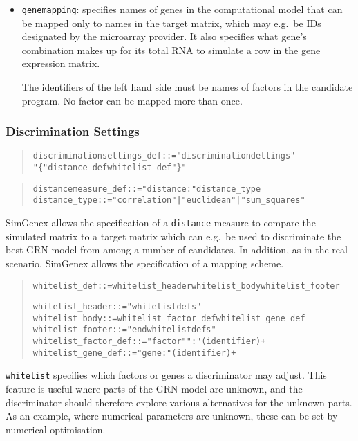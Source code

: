 \documentclass[a4paper,fleqn]{article}
\newcommand{\computercode}[1]{\texttt{#1}}
\newenvironment{ebnfrule}{\begin{footnotesize}\begin{quote}\begin{alltt}}{\end{alltt}\end{quote}\end{footnotesize}}
\begin{document}
\begin{itemize}
\begin{ebnfrule}
\end{ebnfrule}

\item \computercode{genemapping}: specifies names of genes in the computational 
model that can be mapped only to names in the target matrix, which may e.g.\ be IDs 
designated by the microarray provider. It also specifies what gene's
combination makes up for its total RNA to simulate a row in the gene expression matrix. 

The identifiers of the left hand side must be names of factors in the
candidate program. No factor can be mapped more than once.
\end{itemize}



\subsubsection{Discrimination Settings}

\begin{ebnfrule}
  discriminationsettings_def ::= "discriminationdettings" 
  "\{"  distance_def whitelist_def "\}"
\end{ebnfrule}

\begin{ebnfrule}
distancemeasure_def ::= "distance:" distance_type 
distance_type ::= "correlation" | "euclidean" | "sum_squares" 
\end{ebnfrule}

SimGenex allows the specification of a \computercode{distance} measure
to compare the simulated matrix to a target matrix which can e.g.\ be
used to discriminate the best GRN model from among a number of
candidates. In addition, as in the real scenario, SimGenex allows the
specification of a mapping scheme.


\begin{ebnfrule}
whitelist_def ::= whitelist_header whitelist_body whitelist_footer

whitelist_header ::= "whitelistdefs" 
whitelist_body ::= whitelist_factor_def whitelist_gene_def
whitelist_footer ::= "endwhitelistdefs" 
whitelist_factor_def ::= "factor" ":" (identifier)+
whitelist_gene_def ::= "gene: " (identifier)+ 
\end{ebnfrule}


\computercode{whitelist} specifies which factors or genes a discriminator may adjust. 
This feature is useful where parts of the GRN model are unknown, and the discriminator should
therefore explore various alternatives for the unknown parts. As an
example, where numerical parameters are unknown, these can be set by
numerical optimisation.
\end{document}
